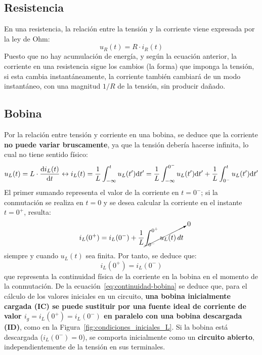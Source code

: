 \subsection{Resistencia}
En una resistencia, la relación entre la tensión y la corriente viene
expresada por la ley de Ohm:
\begin{equation*}
  u_R(t)=R\cdot i_R(t)
\end{equation*}
Puesto que no hay acumulación de energía, y según la ecuación
anterior, la corriente en una resistencia sigue los cambios (la forma)
que imponga la tensión, si esta cambia instantáneamente, la corriente
también cambiará de un modo instantáneo, con una magnitud $1/R$ de la
tensión, sin producir dañado.
	
\subsection{Bobina}
Por la relación entre tensión y corriente en una bobina, se deduce que
la corriente \textbf{no puede variar bruscamente}, ya que la tensión
debería hacerse infinita, lo cual no tiene sentido físico:
\begin{equation*}
  u_L(t) = L \cdot \diff{i_L(t)}{t}
  \leftrightarrow
  i_L(t) = \frac{1}{L} \int^t_{-\infty}u_L(t') \mathrm{d}t'= \frac{1}{L} \int^{0^-}_{-\infty}u_L(t')\mathrm{d}t' + \frac{1}{L} \int^{t}_{0^-}u_L(t')\mathrm{d}t'
\end{equation*}
El primer sumando representa el valor de la corriente en $t=0^-$; si
la conmutación se realiza en $t=0$ y se desea calcular la corriente en
el instante $t=0^+$, resulta:
\begin{equation*}
  i_L(0^+)=i_L(0^-)+ \dfrac{1}{L}\cancelto{0}{\int_{0^-}^{0^+} u_L(t)\, dt}
\end{equation*}
siempre y cuando $u_L(t)$ sea finita. Por tanto, se deduce que:
\begin{equation}\label{eq:continuidad-bobina}
  \boxed{i_L(0^+)=i_L(0^-)}
\end{equation}
que representa la continuidad física de la corriente en la bobina en
el momento de la conmutación. De la
ecuación~\eqref{eq:continuidad-bobina} se deduce que, para el cálculo
de los valores iniciales en un circuito, \textbf{una bobina
  inicialmente cargada (IC) se puede sustituir por una fuente ideal de
  corriente de valor $i_g=i_L(0^+)=i_L(0^-)$ en paralelo con una
  bobina descargada (ID)}, como en la
Figura~\ref{fig:condiciones_iniciales_L}. Si la bobina está descargada
($i_L(0^-)=0$), se comporta inicialmente como un \textbf{circuito
  abierto}, independientemente de la tensión en sus terminales.

